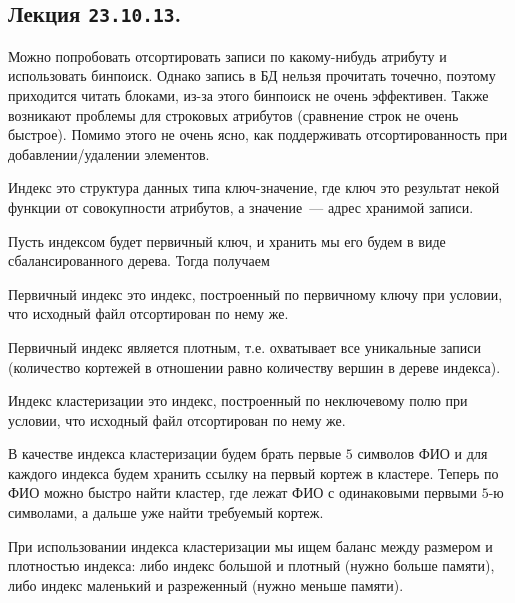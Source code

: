 \subsection{%
  Лекция \texttt{23.10.13}.%
}


Можно попробовать отсортировать записи по какому-нибудь атрибуту и использовать
бинпоиск. Однако запись в БД нельзя прочитать точечно, поэтому приходится читать
блоками, из-за этого бинпоиск не очень эффективен. Также возникают проблемы для
строковых атрибутов (сравнение строк не очень быстрое). Помимо этого не очень
ясно, как поддерживать отсортированность при добавлении/удалении элементов.

\begin{definition}
  Индекс это структура данных типа ключ-значение, где ключ это результат некой
  функции от совокупности атрибутов, а значение~--- адрес хранимой записи.
\end{definition}

Пусть индексом будет первичный ключ, и хранить мы его будем в виде
сбалансированного дерева. Тогда получаем

\begin{definition}
  Первичный индекс это индекс, построенный по первичному ключу при условии, что
  исходный файл отсортирован по нему же.
\end{definition}

Первичный индекс является плотным, т.е. охватывает все уникальные записи
(количество кортежей в отношении равно количеству вершин в дереве индекса).

\begin{definition}
  Индекс кластеризации это индекс, построенный по неключевому полю при условии,
  что исходный файл отсортирован по нему же.
\end{definition}

\begin{example}
  В качестве индекса кластеризации будем брать первые \(5\) символов ФИО и для
  каждого индекса будем хранить ссылку на первый кортеж в кластере. Теперь по
  ФИО можно быстро найти кластер, где лежат ФИО с одинаковыми первыми \(5\)-ю
  символами, а дальше уже найти требуемый кортеж.
\end{example}

\begin{remark}
  При использовании индекса кластеризации мы ищем баланс между размером и
  плотностью индекса: либо индекс большой и плотный (нужно больше памяти), либо
  индекс маленький и разреженный (нужно меньше памяти).
\end{remark}

